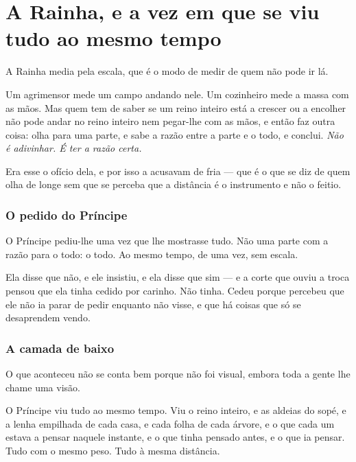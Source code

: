 \documentclass[livro.tex]{subfiles}
\begin{document}
\chapter{A Rainha, e a vez em que se viu tudo ao mesmo tempo}

A Rainha media pela escala, que é o modo de medir de quem não pode ir lá.

\medskip

Um agrimensor mede um campo andando nele. Um cozinheiro mede a massa com as mãos. Mas quem tem de
saber se um reino inteiro está a crescer ou a encolher não pode andar no reino inteiro nem
pegar-lhe com as mãos, e então faz outra coisa: olha para uma parte, e sabe a razão entre a parte
e o todo, e conclui. \emph{Não é adivinhar. É ter a razão certa.}

\medskip

Era esse o ofício dela, e por isso a acusavam de fria --- que é o que se diz de quem olha de longe
sem que se perceba que a distância é o instrumento e não o feitio.

\subsection*{O pedido do Príncipe}

O Príncipe pediu-lhe uma vez que lhe mostrasse tudo. Não uma parte com a razão para o todo: o
todo. Ao mesmo tempo, de uma vez, sem escala.

\medskip

Ela disse que não, e ele insistiu, e ela disse que sim --- e a corte que ouviu a troca pensou que
ela tinha cedido por carinho. Não tinha. Cedeu porque percebeu que ele não ia parar de pedir
enquanto não visse, e que há coisas que só se desaprendem vendo.

\subsection*{A camada de baixo}

O que aconteceu não se conta bem porque não foi visual, embora toda a gente lhe chame uma visão.

\medskip

O Príncipe viu tudo ao mesmo tempo. Viu o reino inteiro, e as aldeias do sopé, e a lenha empilhada
de cada casa, e cada folha de cada árvore, e o que cada um estava a pensar naquele instante, e o
que tinha pensado antes, e o que ia pensar. Tudo com o mesmo peso. Tudo à mesma distância.
\end{document}
